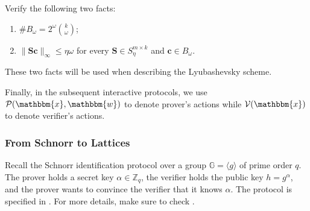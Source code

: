 \documentclass[../../book.tex]{subfiles}
\begin{document}
\begin{exercise}\label{exercise:challenge-set}
    Verify the following two facts:
    \begin{enumerate}
        \item $\#B_{\omega} = 2^{\omega}\binom{k}{\omega}$;
        \item $\|\mathbf{S}\mathbf{c}\|_{\infty} \leq \eta\omega$ for every $\mathbf{S} \in S_{\eta}^{m \times k}$ and $\mathbf{c} \in B_{\omega}$.
    \end{enumerate}
    These two facts will be used when describing the Lyubashevsky scheme.
\end{exercise}

Finally, in the subsequent interactive protocols, we use \colorbox{oc-blue-1}{$\mathcal{P}(\mathbbm{x}, \mathbbm{w})$} to denote prover's actions while \colorbox{oc-blue-1}{$\mathcal{V}(\mathbbm{x})$} to denote verifier's actions.

\subsubsection{From Schnorr to Lattices}

Recall the Schnorr identification protocol over a group $\mathbb{G} = \langle g \rangle$ of prime order $q$.
The prover holds a secret key $\alpha \in \mathbb{Z}_q$, the verifier holds the public key $h = g^{\alpha}$, and the prover wants to convince the verifier that it knows $\alpha$.
The protocol is specified in .
For more details, make sure to check .
\end{document}
